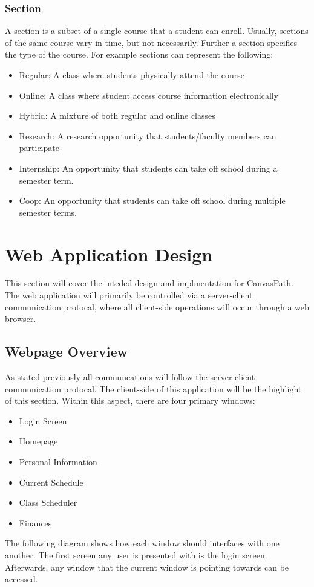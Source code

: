 \documentclass{article}
\begin{document}
  \subsubsection{Section}\label{sec:Requirements:Groups:Section}
    A section is a subset of a single course that a student can enroll.  Usually, sections of the same course vary in time, but not necessarily.  Further a section specifies the type of the course.  For example sections can represent the following:
    \begin{itemize}
      \item Regular: A class where students physically attend the course
      \item Online: A class where student access course information electronically
      \item Hybrid: A mixture of both regular and online classes
      \item Research: A research opportunity that students/faculty members can participate
      \item Internship: An opportunity that students can take off school during a semester term.
      \item Coop: An opportunity that students can take off school during multiple semester terms.
    \end{itemize}

    \newpage


  \section{Web Application Design}\label{sec:Web}
    This section will cover the inteded design and implmentation for CanvasPath.  The web application will primarily be controlled via a server-client communication protocal, where all client-side operations will occur through a web browser.

  \subsection{Webpage Overview}\label{sec:Web:Overview}
    As stated previously all communcations will follow the server-client communication protocal.  The client-side of this application will be the highlight of this section.  Within this aspect, there are four primary windows:
    \begin{itemize}
      \item Login Screen
      \item Homepage
      \item Personal Information
      \item Current Schedule
      \item Class Scheduler
      \item Finances
    \end{itemize}
    The following diagram shows how each window should interfaces with one another.  The first screen any user is presented with is the login screen.  Afterwards, any window that the current window is pointing towards can be accessed.
\end{document}
